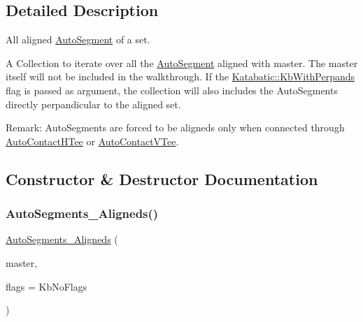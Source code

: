 \subsection{Detailed Description}
All aligned \mbox{\hyperlink{classKatabatic_1_1AutoSegment}{Auto\+Segment}} of a set. 

A Collection to iterate over all the \mbox{\hyperlink{classKatabatic_1_1AutoSegment}{Auto\+Segment}} aligned with {\ttfamily master}. The {\ttfamily master} itself will not be included in the walkthrough. If the \mbox{\hyperlink{namespaceKatabatic_a2af2ad6b6441614038caf59d04b3b217ae2d033c8f78b61468c827de8db5fe839}{Katabatic\+::\+Kb\+With\+Perpands}} flag is passed as argument, the collection will also includes the Auto\+Segments directly perpandicular to the aligned set.

\begin{DoxyParagraph}{Remark\+: Auto\+Segments are forced to be aligneds only when connected through}
\mbox{\hyperlink{classKatabatic_1_1AutoContactHTee}{Auto\+Contact\+H\+Tee}} or \mbox{\hyperlink{classKatabatic_1_1AutoContactVTee}{Auto\+Contact\+V\+Tee}}. 
\end{DoxyParagraph}


\subsection{Constructor \& Destructor Documentation}
\mbox{\label{classKatabatic_1_1AutoSegments__Aligneds_a97d48d49a2372cf289d321e6abf81c2d}} 
\subsubsection{\texorpdfstring{Auto\+Segments\+\_\+\+Aligneds()}{AutoSegments\_Aligneds()}\hspace{0.1cm}{\footnotesize\ttfamily [1/2]}}
{\footnotesize\ttfamily \mbox{\hyperlink{classKatabatic_1_1AutoSegments__Aligneds}{Auto\+Segments\+\_\+\+Aligneds}} (\begin{DoxyParamCaption}\item[{\mbox{\hyperlink{classKatabatic_1_1AutoSegment}{Auto\+Segment}} $\ast$}]{master,  }\item[{unsigned int}]{flags = {\ttfamily KbNoFlags} }\end{DoxyParamCaption})\hspace{0.3cm}{\ttfamily [inline]}}

